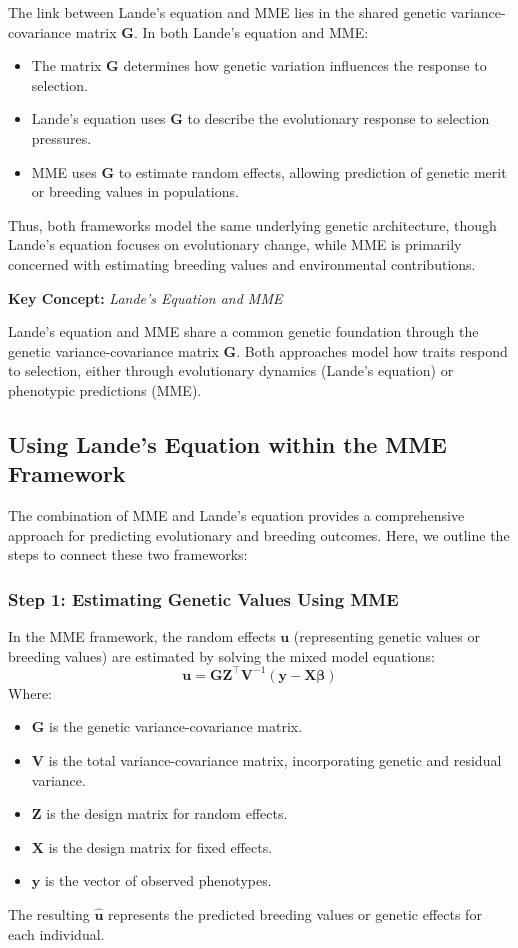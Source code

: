 \documentclass[12pt,a4paper]{article}
\newenvironment{keyconceptbox}[1][]
{\begin{basebox}[linecolor=uqblue]
\textbf{\color{uqblue}Key Concept:} \textit{#1}\par\noindent\ignorespaces}
{\end{basebox}}
\begin{document}
The link between Lande’s equation and MME lies in the shared genetic variance-covariance matrix \( \mathbf{G} \). In both Lande’s equation and MME:
\begin{itemize}
    \item The matrix \( \mathbf{G} \) determines how genetic variation influences the response to selection.
    \item Lande’s equation uses \( \mathbf{G} \) to describe the evolutionary response to selection pressures.
    \item MME uses \( \mathbf{G} \) to estimate random effects, allowing prediction of genetic merit or breeding values in populations.
\end{itemize}
Thus, both frameworks model the same underlying genetic architecture, though Lande’s equation focuses on evolutionary change, while MME is primarily concerned with estimating breeding values and environmental contributions.

\begin{keyconceptbox}[Lande's Equation and MME]
Lande’s equation and MME share a common genetic foundation through the genetic variance-covariance matrix \( \mathbf{G} \). Both approaches model how traits respond to selection, either through evolutionary dynamics (Lande’s equation) or phenotypic predictions (MME).
\end{keyconceptbox}

\subsection{Using Lande’s Equation within the MME Framework}

The combination of MME and Lande’s equation provides a comprehensive approach for predicting evolutionary and breeding outcomes. Here, we outline the steps to connect these two frameworks:

\subsubsection{Step 1: Estimating Genetic Values Using MME}

In the MME framework, the random effects \( \mathbf{u} \) (representing genetic values or breeding values) are estimated by solving the mixed model equations:
\[
\mathbf{u} = \mathbf{G} \mathbf{Z}^\top \mathbf{V}^{-1} (\mathbf{y} - \mathbf{X} \boldsymbol{\beta})
\]
Where:
\begin{itemize}
    \item \( \mathbf{G} \) is the genetic variance-covariance matrix.
    \item \( \mathbf{V} \) is the total variance-covariance matrix, incorporating genetic and residual variance.
    \item \( \mathbf{Z} \) is the design matrix for random effects.
    \item \( \mathbf{X} \) is the design matrix for fixed effects.
    \item \( \mathbf{y} \) is the vector of observed phenotypes.
\end{itemize}
The resulting \( \hat{\mathbf{u}} \) represents the predicted breeding values or genetic effects for each individual.
\end{document}
